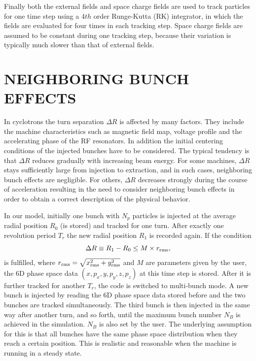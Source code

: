 \documentclass[aps,prstab,twocolumn,superscriptaddress]{revtex4}
\begin{document}
Finally both the external fields and space charge fields are used to track particles for one time step using a 4$th$ order Runge-Kutta (RK) integrator, in which 
the fields are evaluated for four times in each tracking step. Space charge fields are assumed to be constant during one tracking step,
because their variation is typically much slower than that of external fields. 
    
\section{NEIGHBORING BUNCH EFFECTS}
In cyclotrons the turn separation $\Delta R$ is affected by many factors. They include the machine characteristics such as magnetic field map, 
voltage profile and the accelerating phase of the RF resonators. In addition the initial centering conditions of the injected bunches have to be considered. 
The typical tendency is that  $\Delta R$ reduces gradually  with increasing beam energy.
For some machines, $\Delta R$ stays sufficiently large from injection to extraction, and in such cases,  neighboring bunch effects are negligible. 
For others, $\Delta R$ decreases strongly during the course of acceleration resulting in the need to consider neighboring bunch effects in order to
obtain a correct description of the physical behavior.

In our model, initially one bunch with $N_p$ particles is injected at the average radial position $R_0$ (is stored) and tracked for one turn. 
After exactly one revolution period $T_{r}$ the new radial position $R_1$ is recorded again. If the condition
\begin{equation}\label{eq:dR}
  \Delta R \equiv R_1-R_0 \le M \times r_{\RM{rms}},
\end{equation}
is fulfilled, where $r_{\RM{rms}}=\sqrt{x_{\RM{rms}}^{2}+y_{\RM{rms}}^2}$ and $M$ are parameters given by the user, the 6D phase space data $(x, p_x, y, p_y, z, p_z)$ at this time step is stored. 
After it is further tracked for another $T_{r}$, the code is switched to multi-bunch mode. 
A new bunch is injected by reading the 6D phase space data stored before and the two bunches are tracked simultaneously.
The third bunch is then injected in the same way after another turn, and so forth, until the maximum bunch number $N_B$ is achieved in the simulation. $N_B$ is also set by the user.
The underlying assumption for this is that all bunches have the same phase space distribution when they reach a certain position.
This is realistic and reasonable when the machine is running in a steady state.  
\end{document}
